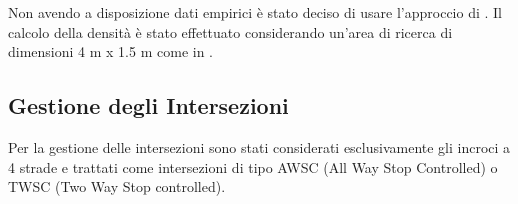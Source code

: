 




Non avendo a disposizione dati empirici è stato deciso di usare l'approccio di \textcite{wang2021novel}.
%
Il calcolo della densità è stato effettuato considerando un'area di ricerca di dimensioni 4 m x 1.5 m 
come in \textcite{goto2012tsunami, wang2021novel}.



\newpage

\subsection{Gestione degli Intersezioni}
Per la gestione delle intersezioni sono stati considerati esclusivamente gli incroci a 4 strade e trattati come intersezioni di tipo AWSC (All Way Stop Controlled) o TWSC (Two Way Stop controlled).

